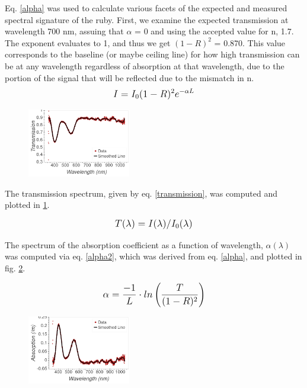 \documentclass[aps,prl,reprint]{revtex4-2}
\begin{document}
Eq. \ref{alpha} was used to calculate various facets of the expected and measured
spectral signature of the ruby. First, we examine the expected transmission at
wavelength 700 nm, assuing that $\alpha$ = 0 and using the accepted value for n, 1.7.
The exponent evaluates to 1, and thus we get $(1-R)^2$ = 0.870. This value 
corresponds to the baseline (or maybe ceiling line) for how high transmission can
be at any wavelength regardless of absorption at that wavelength, due to the portion
of the signal that will be reflected due to the mismatch in n. \\

\begin{equation}
	\mathlarger{I = I_0(1-R)^2e^{-\alpha L}}
    \label{alpha}
\end{equation}

\begin{figure}[h]
\includegraphics[width=0.4\textwidth]{../Images/l3_B_b.png}
\caption{\label{transmission_plot}}
\end{figure}

The transmission spectrum, given by eq. \ref{transmission}, was computed and plotted in
\ref{transmission_plot}.

\begin{equation}
	\mathlarger{T(\lambda) = I(\lambda)/I_0(\lambda)}
    \label{transmission}
\end{equation}

The spectrum of the absorption coefficient as a function of wavelength, 
$\alpha(\lambda)$ was computed via eq. \ref{alpha2}, which was derived from eq. 
\ref{alpha}, and plotted in fig. \ref{absorption}.

\begin{equation}
	\mathlarger{\alpha = \frac{-1}{L} \cdot ln\left(\frac{T}{(1-R)^2}\right)}
	\citation{\label{alpha2}, derived from \ref{alpha}}
\end{equation}

\begin{figure}[h]
\includegraphics[width=0.4\textwidth]{../Images/l3_B_c.png}
\caption{\label{absorption}}
\end{figure}
\end{document}
